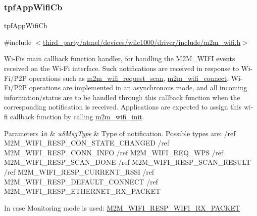 \subsubsection{\texorpdfstring{tpf\+App\+Wifi\+Cb}{tpfAppWifiCb}}
{\footnotesize\ttfamily tpf\+App\+Wifi\+Cb}



{\ttfamily \#include $<$\hyperlink{m2m__wifi_8h}{third\+\_\+party/atmel/devices/wilc1000/driver/include/m2m\+\_\+wifi.\+h}$>$}



Wi-\/\+Fi\textquotesingle{}s main callback function handler, for handling the M2\+M\+\_\+\+W\+I\+FI events received on the Wi-\/\+Fi interface. Such notifications are received in response to Wi-\/\+Fi/\+P2P operations such as \hyperlink{group__WifiRequestScanFn_ga499dfa24a19c2e84776aeabedf897135}{m2m\+\_\+wifi\+\_\+request\+\_\+scan}, \hyperlink{group__WifiConnectFn_ga19c9871147efe70f5d9c2cc2cdd5bff0}{m2m\+\_\+wifi\+\_\+connect}. Wi-\/\+Fi/\+P2P operations are implemented in an asynchronous mode, and all incoming information/status are to be handled through this callback function when the corresponding notification is received. Applications are expected to assign this wi-\/fi callback function by calling \hyperlink{group__WifiInitFn_ga73c734812e844d96d860c4e93e9daf35}{m2m\+\_\+wifi\+\_\+init}. 


\begin{DoxyParams}[1]{Parameters}
\mbox{\tt in}  & {\em u8\+Msg\+Type} & Type of notification. Possible types are\+: /ref M2\+M\+\_\+\+W\+I\+F\+I\+\_\+\+R\+E\+S\+P\+\_\+\+C\+O\+N\+\_\+\+S\+T\+A\+T\+E\+\_\+\+C\+H\+A\+N\+G\+ED /ref M2\+M\+\_\+\+W\+I\+F\+I\+\_\+\+R\+E\+S\+P\+\_\+\+C\+O\+N\+N\+\_\+\+I\+N\+FO /ref M2\+M\+\_\+\+W\+I\+F\+I\+\_\+\+R\+E\+Q\+\_\+\+W\+PS /ref M2\+M\+\_\+\+W\+I\+F\+I\+\_\+\+R\+E\+S\+P\+\_\+\+S\+C\+A\+N\+\_\+\+D\+O\+NE /ref M2\+M\+\_\+\+W\+I\+F\+I\+\_\+\+R\+E\+S\+P\+\_\+\+S\+C\+A\+N\+\_\+\+R\+E\+S\+U\+LT /ref M2\+M\+\_\+\+W\+I\+F\+I\+\_\+\+R\+E\+S\+P\+\_\+\+C\+U\+R\+R\+E\+N\+T\+\_\+\+R\+S\+SI /ref M2\+M\+\_\+\+W\+I\+F\+I\+\_\+\+R\+E\+S\+P\+\_\+\+D\+E\+F\+A\+U\+L\+T\+\_\+\+C\+O\+N\+N\+E\+CT /ref M2\+M\+\_\+\+W\+I\+F\+I\+\_\+\+R\+E\+S\+P\+\_\+\+E\+T\+H\+E\+R\+N\+E\+T\+\_\+\+R\+X\+\_\+\+P\+A\+C\+K\+ET\\
\hline
\end{DoxyParams}
In case Monitoring mode is used\+: \hyperlink{group__WlanEnums_gga064de09dec1d5e88ed8d075fa40f57dea9a121b41defa5ffcb174fe304cbce432}{M2\+M\+\_\+\+W\+I\+F\+I\+\_\+\+R\+E\+S\+P\+\_\+\+W\+I\+F\+I\+\_\+\+R\+X\+\_\+\+P\+A\+C\+K\+ET}


